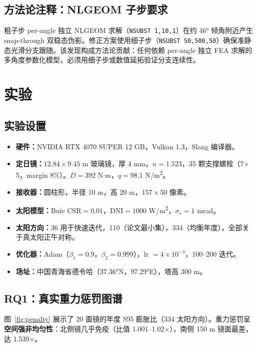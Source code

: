 \documentclass[12pt,a4paper]{ctexart}
\begin{document}
\subsection{方法论注释：NLGEOM 子步要求}
\label{sec:substep}

粗子步 per-angle 独立 NLGEOM 求解（\verb|NSUBST 1,10,1|）在约 46° 倾角附近产生 snap-through 双稳态伪影。修正方案使用细子步（\verb|NSUBST 50,500,50|）确保准静态光滑分支跟随。该发现构成方法论贡献：任何依赖 per-angle 独立 FEA 求解的多角度参数化模型，必须用细子步或数值延拓验证分支连续性。

\section{实验}
\label{sec:experiments}

\subsection{实验设置}

\begin{itemize}
  \item \textbf{硬件：}NVIDIA RTX 4070 SUPER 12 GB，Vulkan 1.3，Slang 编译器。
  \item \textbf{定日镜：}$12.84 \times 9.45$ m 玻璃镜，厚 4 mm，$n=1.523$，35 颗支撑螺栓（7$\times$5，margin 8\%）。$D=392$ N$\cdot$m，$q=98.1$ N/m\textsuperscript{2}。
  \item \textbf{接收器：}圆柱形，半径 10 m，高 20 m，$157\times50$ 像素。
  \item \textbf{太阳模型：}Buie CSR$=0.01$，DNI$=1000$ W/m\textsuperscript{2}，$\sigma_s = 1$ mrad。
  \item \textbf{太阳方向：}36 用于快速迭代，110（论文最小集），334（均衡年度），全部关于真太阳正午对称。
  \item \textbf{优化器：}Adam（$\beta_1{=}0.9$，$\beta_2{=}0.999$），lr $=4\times10^{-4}$，100--200 迭代。
  \item \textbf{场址：}中国青海省德令哈（37.36\si{\degree}N，97.29\si{\degree}E），塔高 300 m。
\end{itemize}

\subsection{RQ1：真实重力惩罚图谱}

图~\ref{fig:penalty} 展示了 20 面镜的年度 S95 膨胀比（334 太阳方向）。重力惩罚呈\textbf{空间强非均匀性}：北侧镜几乎免疫（比值 1.001--1.02$\times$），南侧 150 m 镜面最差，达 1.539$\times$。
\end{document}
